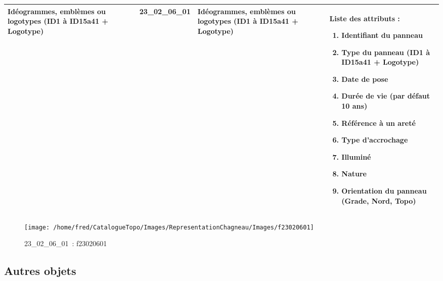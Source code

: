 \documentclass[12pt,titlepage]{book}
\begin{document}
\renewcommand{\arraystretch}{1.2}
\begin{supertabular}{|p{10cm}|c|p{13cm}|p{12cm}|}
 Idéogrammes, emblèmes ou logotypes (ID1 à ID15a41 + Logotype) & 23\_02\_06\_01 & Idéogrammes, emblèmes ou logotypes (ID1 à ID15a41 + Logotype) & Liste des attributs :
\begin{enumerate}
  \item Identifiant du panneau  \item Type du panneau (ID1 à ID15a41 + Logotype)  \item Date de pose  \item Durée de vie (par défaut 10 ans)  \item Référence à un areté  \item Type d'accrochage  \item Illuminé  \item Nature  \item Orientation du panneau (Grade, Nord, Topo)\end{enumerate}
\\
\hline
\end{supertabular}
\begin{figure}[h!]
  \hfill         %
  \begin{minipage}[t]{3cm}
    \begin{center}
      \texttt{[image: /home/fred/CatalogueTopo/Images/RepresentationChagneau/Images/f23020601]}
      \caption[~23\_02\_06\_01]{\small{23\_02\_06\_01~:} \tiny{f23020601}}\label{f23020601}
    \end{center}
  \end{minipage}
\end{figure}


\subsection{Autres objets}
\noindent
\vspace{\baselineskip}
\end{document}
